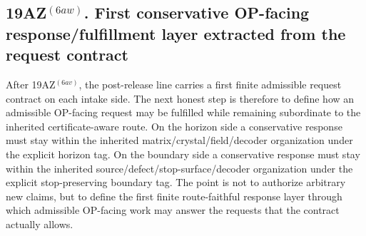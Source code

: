\subsection*{19AZ$^{(6aw)}$. First conservative OP-facing response/fulfillment layer extracted from the request contract}
\label{sec:first-conservative-op-facing-response-fulfillment-layer-extracted-from-the-request-contract}
After 19AZ$^{(6av)}$, the post-release line carries a first finite admissible request contract on each intake side. The next honest step is therefore to define how an admissible OP-facing request may be fulfilled while remaining subordinate to the inherited certificate-aware route. On the horizon side a conservative response must stay within the inherited matrix/crystal/field/decoder organization under the explicit horizon tag. On the boundary side a conservative response must stay within the inherited source/defect/stop-surface/decoder organization under the explicit stop-preserving boundary tag. The point is not to authorize arbitrary new claims, but to define the first finite route-faithful response layer through which admissible OP-facing work may answer the requests that the contract actually allows.

